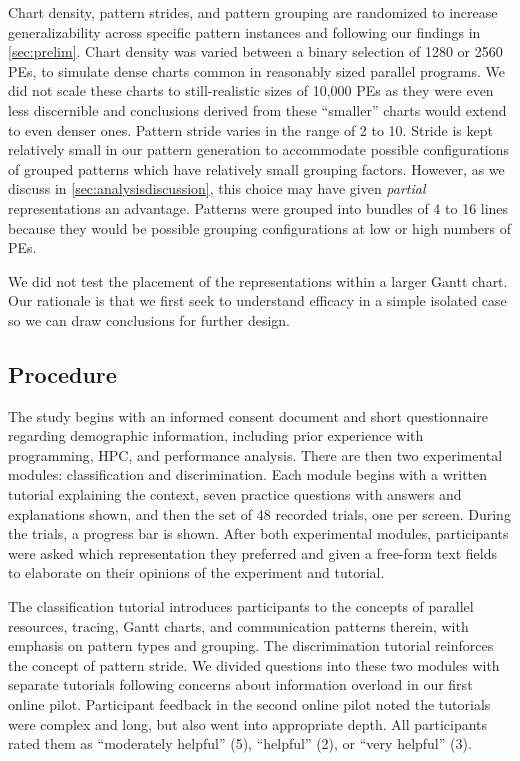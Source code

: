 Chart density, pattern strides, and pattern grouping are randomized to increase generalizability across specific pattern instances and following our findings in \autoref{sec:prelim}. Chart density was varied between a binary selection of 1280 or 2560 PEs, to simulate dense charts common in reasonably sized parallel programs. We did not scale these charts to still-realistic sizes of 10,000 PEs as they were even less discernible and conclusions derived from these ``smaller'' charts would extend to even denser ones.  Pattern stride varies in the range of 2 to 10. Stride is kept relatively small in our pattern generation to accommodate possible configurations of grouped patterns which have relatively small grouping factors. However, as we discuss in \autoref{sec:analysisdiscussion}, this choice may have given {\em partial} representations an advantage. Patterns were grouped into bundles of 4 to 16 lines because they would be possible grouping configurations at low or high numbers of PEs.

We did not test the placement of the representations within a larger Gantt chart. Our rationale is that we first seek to understand efficacy in a simple isolated case so we can draw conclusions for further design.

    

\subsection{Procedure}
    The study begins with an informed consent document and short questionnaire regarding demographic information, including prior experience with programming, HPC, and performance analysis. There are then two experimental modules: classification and discrimination. Each module begins with a written tutorial explaining the context, seven practice questions with answers and explanations shown, and then the set of 48 recorded trials, one per screen. During the trials, a progress bar is shown. After both experimental modules, participants were asked which representation they preferred and given a free-form text fields to elaborate on their opinions of the experiment and tutorial.

    The classification tutorial introduces participants to the concepts of parallel resources, tracing, Gantt charts, and communication patterns therein, with emphasis on pattern types and grouping. The discrimination tutorial reinforces the concept of pattern stride. We divided questions into these two modules with separate tutorials following concerns about information overload in our first online pilot.
    Participant feedback in the second online pilot noted the tutorials were complex and long, but also went into appropriate depth. All participants rated them as ``moderately helpful'' (5), ``helpful'' (2), or ``very helpful'' (3).



